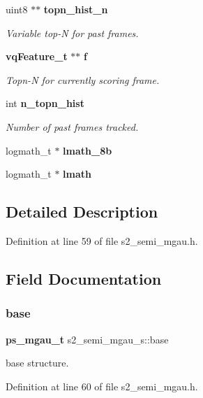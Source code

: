 \begin{DoxyCompactItemize}
uint8 $\ast$$\ast$ \textbf{ topn\+\_\+hist\+\_\+n}
\begin{DoxyCompactList}\small\item\em Variable top-\/N for past frames. \end{DoxyCompactList}\item 
\textbf{ vq\+Feature\+\_\+t} $\ast$$\ast$ \textbf{ f}
\begin{DoxyCompactList}\small\item\em Topn-\/N for currently scoring frame. \end{DoxyCompactList}\item 
int \textbf{ n\+\_\+topn\+\_\+hist}
\begin{DoxyCompactList}\small\item\em Number of past frames tracked. \end{DoxyCompactList}\item 
\mbox{\label{structs2__semi__mgau__s_a1900c90c8ab30d38288fb26b402eb325}} 
logmath\+\_\+t $\ast$ {\bfseries lmath\+\_\+8b}
\item 
\mbox{\label{structs2__semi__mgau__s_a8f8f7c72297132fb9a939c9981562ae6}} 
logmath\+\_\+t $\ast$ {\bfseries lmath}
\end{DoxyCompactItemize}


\subsection{Detailed Description}


Definition at line 59 of file s2\+\_\+semi\+\_\+mgau.\+h.



\subsection{Field Documentation}
\mbox{\label{structs2__semi__mgau__s_a9002aae86249006f0b045e5203ec9687}} 
\subsubsection{base}
{\footnotesize\ttfamily \textbf{ ps\+\_\+mgau\+\_\+t} s2\+\_\+semi\+\_\+mgau\+\_\+s\+::base}



base structure. 



Definition at line 60 of file s2\+\_\+semi\+\_\+mgau.\+h.

